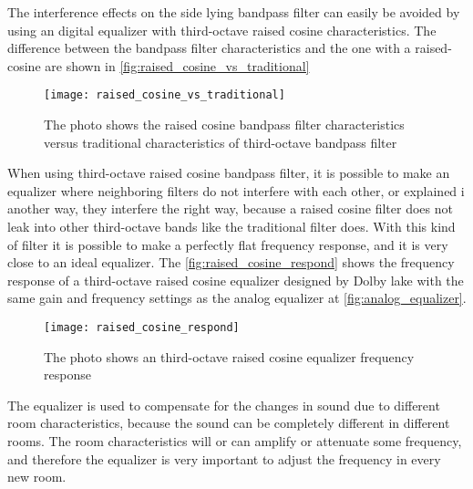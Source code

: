 The interference effects on the side lying bandpass filter can easily be avoided by using an digital equalizer with third-octave raised cosine characteristics. The difference between the  bandpass filter characteristics and the one with a raised-cosine are shown in \autoref{fig:raised_cosine_vs_traditional}

\begin{figure} [htbp]
 \centering
  \texttt{[image: raised\_cosine\_vs\_traditional]}
  \caption{The photo shows the raised cosine bandpass filter characteristics versus traditional characteristics of third-octave bandpass filter \citep{nordic}
  }
  \label{fig:raised_cosine_vs_traditional}
\end{figure}



When using third-octave raised cosine bandpass filter, it is possible to make an equalizer where neighboring filters do not interfere with each other, or explained i another way, they interfere the right way, because a raised cosine filter does not leak into other third-octave bands like the traditional filter does. With this kind of filter it is possible to make a perfectly flat frequency response, and it is very close to an ideal equalizer. The \autoref{fig:raised_cosine_respond} shows the frequency response of a third-octave raised cosine equalizer designed by Dolby lake with the same gain and frequency settings as the analog equalizer at \autoref{fig:analog_equalizer}.

\begin{figure} [htbp]
 \centering
  \texttt{[image: raised\_cosine\_respond]}
  \caption{The photo shows an third-octave raised cosine equalizer frequency response  \citep{nordic}
  }
  \label{fig:raised_cosine_respond}
\end{figure}


The equalizer is used to compensate for the changes in sound due to different room characteristics, because the sound can be completely different in different rooms. The room characteristics will or can amplify or attenuate some frequency, and therefore the equalizer is very important to adjust the frequency in every new room.\citep{howtogeek} 
